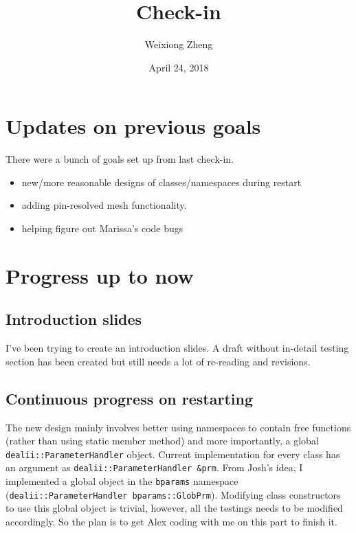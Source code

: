 \documentclass{article}
\title{Check-in} %
\author{Weixiong Zheng} %
\date{April 24, 2018} %
\begin{document}
\maketitle %

\section{Updates on previous goals}
There were a bunch of goals set up from last check-in.

\begin{itemize}
	\item new/more reasonable designs of classes/namespaces during restart
	\item adding pin-resolved mesh functionality.
	\item helping figure out Marissa's code bugs
\end{itemize}
\section{Progress up to now}
\subsection{Introduction slides}
I've been trying to create an introduction slides. A draft without in-detail testing section has been created but still needs a lot of re-reading and revisions.

\subsection{Continuous progress on restarting}
The new design mainly involves better using namespaces to contain free functions (rather than using static member method) and more importantly, a global {\tt dealii::ParameterHandler} object. Current implementation for every class has an argument as {\tt dealii::ParameterHandler \&prm}. From Josh's idea, I implemented a global object in the {\tt bparams} namespace ({\tt dealii::ParameterHandler bparams::GlobPrm}). Modifying class constructors to use this global object is trivial, however, all the testings needs to be modified accordingly. So the plan is to get Alex coding with me on this part to finish it.
\end{document}
